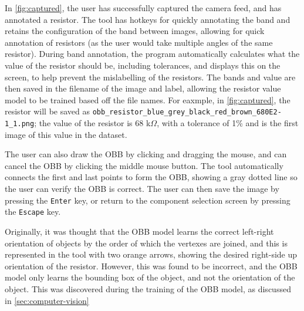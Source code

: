 In \autoref{fig:captured}, the user has successfully captured the camera feed, and has annotated a resistor. The tool has hotkeys for quickly annotating the band and retains the configuration of the band between images, allowing for quick annotation of resistors (as the user would take multiple angles of the same resistor). During band annotation, the program automatically calculates what the value of the resistor should be, including tolerances, and displays this on the screen, to help prevent the mislabelling of the resistors. The bands and value are then saved in the filename of the image and label, allowing the resistor value model to be trained based off the file names. For eaxmple, in \autoref{fig:captured}, the resistor will be saved as \texttt{obb\_resistor\_blue\_grey\_black\_red\_brown\_680E2-1\_1.png}; the value of the resistor is 68 k$\Omega$, with a tolerance of 1\% and is the first image of this value in the dataset.

The user can also draw the OBB by clicking and dragging the mouse, and can cancel the OBB by clicking the middle mouse button. The tool automatically connects the first and last points to form the OBB, showing a gray dotted line so the user can verify the OBB is correct. The user can then save the image by pressing the \texttt{Enter} key, or return to the component selection screen by pressing the \texttt{Escape} key.

Originally, it was thought that the OBB model learns the correct left-right orientation of objects by the order of which the vertexes are joined, and this is represented in the tool with two orange arrows, showing the desired right-side up orientation of the resistor. However, this was found to be incorrect, and the OBB model only learns the bounding box of the object, and not the orientation of the object. This was discovered during the training of the OBB model, as discussed in \autoref{sec:computer-vision}

